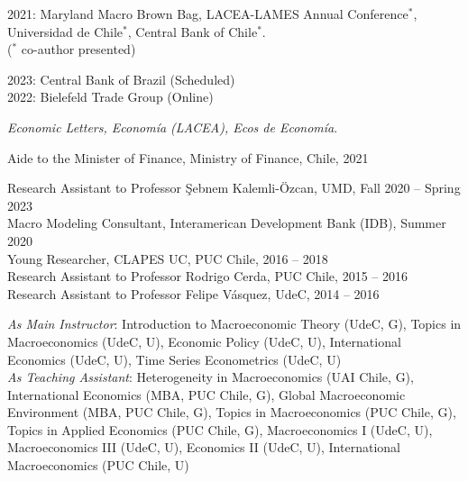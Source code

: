 \documentclass[10pt]{article}
\begin{document}
\begin{description}[leftmargin=10em,style=nextline]
      2021: Maryland Macro Brown Bag, LACEA-LAMES Annual Conference$^\ast$, Universidad de Chile$^\ast$, Central Bank of Chile$^\ast$.\\
      ({\footnotesize $^{*}$ co-author presented})\\[-.1in]
      \item[Invited Seminars] 2023: Central Bank of Brazil (Scheduled)\\
      2022: Bielefeld Trade Group (Online)\\[-.1in]
      \item[Referee]  \emph{Economic Letters, Econom\'ia (LACEA), Ecos de Econom\'ia}.\\[-.1in]
      \item[Relevant] Aide to the Minister of Finance, Ministry of Finance, Chile, 2021\\[-0.22in]
      \item[Experience]  Research Assistant to Professor \c{S}ebnem Kalemli-\"{O}zcan, UMD, Fall 2020 -- Spring 2023\\
      Macro Modeling Consultant,  Interamerican Development Bank (IDB), Summer 2020\\
      Young Researcher, CLAPES UC, PUC Chile, 2016 -- 2018\\
      Research Assistant to Professor Rodrigo Cerda, PUC Chile, 2015 -- 2016\\
      Research Assistant to Professor Felipe V\'asquez, UdeC, 2014 -- 2016\\[-.1in]
      \item[Teaching Experience] \textit{As Main Instructor}: Introduction to Macroeconomic Theory (UdeC, G), Topics in Macroeconomics (UdeC, U), Economic Policy (UdeC, U), International Economics (UdeC, U), Time Series Econometrics (UdeC, U)\\
      \textit{As Teaching Assistant}: Heterogeneity in Macroeconomics (UAI Chile, G), International Economics (MBA, PUC Chile, G), Global Macroeconomic Environment (MBA, PUC Chile, G), Topics in Macroeconomics (PUC Chile, G), Topics in Applied Economics (PUC Chile, G), Macroeconomics I (UdeC, U), Macroeconomics III (UdeC, U), Economics II (UdeC, U), International Macroeconomics (PUC Chile, U)\\[-.1in]


\end{description}
\end{document}
